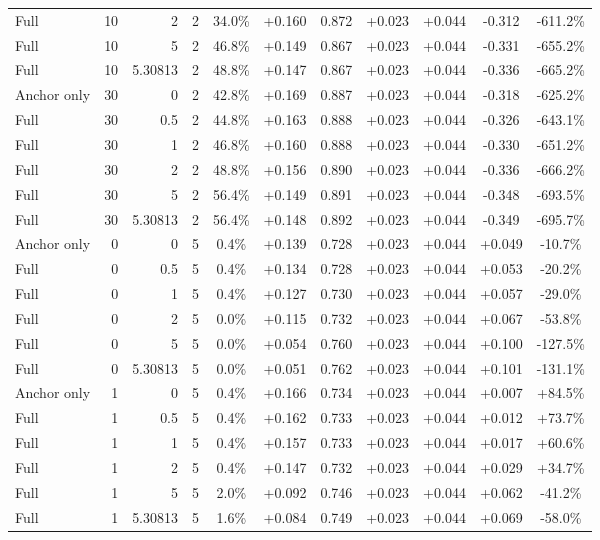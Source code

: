 \begin{table}[htbp]
\begin{tabular}{lrrrccccccc}
Full & 10 & 2 & 2 & 34.0\% & +0.160 & 0.872 & +0.023 & +0.044 & -0.312 & -611.2\% \\
Full & 10 & 5 & 2 & 46.8\% & +0.149 & 0.867 & +0.023 & +0.044 & -0.331 & -655.2\% \\
Full & 10 & 5.30813 & 2 & 48.8\% & +0.147 & 0.867 & +0.023 & +0.044 & -0.336 & -665.2\% \\
Anchor only & 30 & 0 & 2 & 42.8\% & +0.169 & 0.887 & +0.023 & +0.044 & -0.318 & -625.2\% \\
Full & 30 & 0.5 & 2 & 44.8\% & +0.163 & 0.888 & +0.023 & +0.044 & -0.326 & -643.1\% \\
Full & 30 & 1 & 2 & 46.8\% & +0.160 & 0.888 & +0.023 & +0.044 & -0.330 & -651.2\% \\
Full & 30 & 2 & 2 & 48.8\% & +0.156 & 0.890 & +0.023 & +0.044 & -0.336 & -666.2\% \\
Full & 30 & 5 & 2 & 56.4\% & +0.149 & 0.891 & +0.023 & +0.044 & -0.348 & -693.5\% \\
Full & 30 & 5.30813 & 2 & 56.4\% & +0.148 & 0.892 & +0.023 & +0.044 & -0.349 & -695.7\% \\
Anchor only & 0 & 0 & 5 & 0.4\% & +0.139 & 0.728 & +0.023 & +0.044 & +0.049 & -10.7\% \\
Full & 0 & 0.5 & 5 & 0.4\% & +0.134 & 0.728 & +0.023 & +0.044 & +0.053 & -20.2\% \\
Full & 0 & 1 & 5 & 0.4\% & +0.127 & 0.730 & +0.023 & +0.044 & +0.057 & -29.0\% \\
Full & 0 & 2 & 5 & 0.0\% & +0.115 & 0.732 & +0.023 & +0.044 & +0.067 & -53.8\% \\
Full & 0 & 5 & 5 & 0.0\% & +0.054 & 0.760 & +0.023 & +0.044 & +0.100 & -127.5\% \\
Full & 0 & 5.30813 & 5 & 0.0\% & +0.051 & 0.762 & +0.023 & +0.044 & +0.101 & -131.1\% \\
Anchor only & 1 & 0 & 5 & 0.4\% & +0.166 & 0.734 & +0.023 & +0.044 & +0.007 & +84.5\% \\
Full & 1 & 0.5 & 5 & 0.4\% & +0.162 & 0.733 & +0.023 & +0.044 & +0.012 & +73.7\% \\
Full & 1 & 1 & 5 & 0.4\% & +0.157 & 0.733 & +0.023 & +0.044 & +0.017 & +60.6\% \\
Full & 1 & 2 & 5 & 0.4\% & +0.147 & 0.732 & +0.023 & +0.044 & +0.029 & +34.7\% \\
Full & 1 & 5 & 5 & 2.0\% & +0.092 & 0.746 & +0.023 & +0.044 & +0.062 & -41.2\% \\
Full & 1 & 5.30813 & 5 & 1.6\% & +0.084 & 0.749 & +0.023 & +0.044 & +0.069 & -58.0\% \\

\end{tabular}
\end{table}
